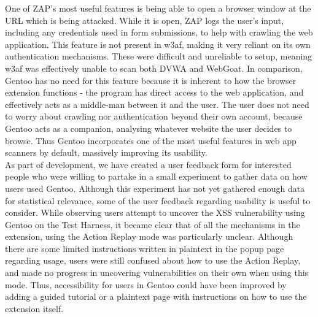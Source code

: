 One of ZAP's most useful features is being able to open a browser window at the URL which is being attacked. While it is open, ZAP logs the user's input, including any credentials used in form submissions, to help with crawling the web application. This feature is not present in w3af, making it very reliant on its own authentication mechanisms. These were difficult and unreliable to setup, meaning w3af was effectively unable to scan both DVWA and WebGoat. In comparison, Gentoo has no need for this feature because it is inherent to how the browser extension functions - the program has direct access to the web application, and effectively acts as a middle-man between it and the user. The user does not need to worry about crawling nor authentication beyond their own account, because Gentoo acts as a companion, analysing whatever website the user decides to browse. Thus Gentoo incorporates one of the most useful features in web app scanners by default, massively improving its usability. \\

As part of development, we have created a user feedback form for interested people who were willing to partake in a small experiment to gather data on how users used Gentoo. Although this experiment has not yet gathered enough data for statistical relevance, some of the user feedback regarding usability is useful to consider. While observing users attempt to uncover the XSS vulnerability using Gentoo on the Test Harness, it became clear that of all the mechanisms in the extension, using the Action Replay mode was particularly unclear. Although there are some limited instructions written in plaintext in the popup page regarding usage, users were still confused about how to use the Action Replay, and made no progress in uncovering vulnerabilities on their own when using this mode. Thus, accessibility for users in Gentoo could have been improved by adding a guided tutorial or a plaintext page with instructions on how to use the extension itself. \\ 






